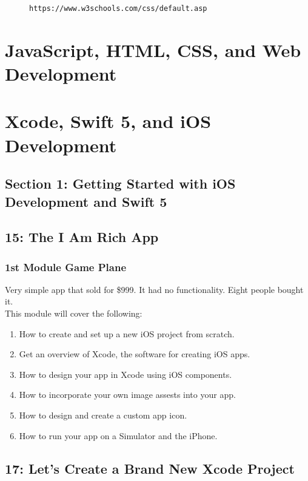 \documentclass[12pt, letterpaper]{article}
\begin{document}
\begin{figure}[ht]
\centering
\begin{BVerbatim}
https://www.w3schools.com/css/default.asp
\end{BVerbatim}
\end{figure}

\section{JavaScript, HTML, CSS, and Web Development}

\section{Xcode, Swift 5, and iOS Development}

\subsection*{Section 1: Getting Started with iOS Development and Swift 5}

\subsection*{15: The I Am Rich App}

\subsubsection*{1st Module Game Plane}

Very simple app that sold for \$999. It had no functionality. Eight people bought it. \\

This module will cover the following:
\begin{enumerate}
    \itemsep0em
    \item{How to create and set up a new iOS project from scratch.}
    \item{Get an overview of Xcode, the software for creating iOS apps.}
    \item{How to design your app in Xcode using iOS components.}
    \item{How to incorporate your own image assests into your app.}
    \item{How to design and create a custom app icon.}
    \item{How to run your app on a Simulator and the iPhone.}
\end{enumerate}

\subsection*{17: Let's Create a Brand New Xcode Project}
\end{document}
